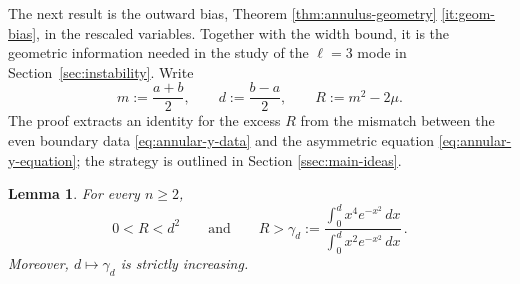 \documentclass[11pt]{article}
\numberwithin{equation}{section}
\newtheorem{lemma}[theorem]{Lemma}
\theoremstyle{definition}
\begin{document}
The next result is the outward bias, Theorem \ref{thm:annulus-geometry} \ref{it:geom-bias}, in the rescaled variables. Together with the width bound, it is the geometric information needed in the study of the $\ell=3$ mode in Section~\ref{sec:instability}. Write
\begin{equation}\label{def:asymmetry}
    m:=\frac{a+b}2,
    \qquad
    d:=\frac{b-a}2,
    \qquad
    R:=m^2-2\mu.
\end{equation}
The proof extracts an identity for the excess $R$ from the mismatch between the even boundary data \eqref{eq:annular-y-data} and the asymmetric equation \eqref{eq:annular-y-equation}; the strategy is outlined in Section \ref{ssec:main-ideas}.

\begin{lemma}\label{lem:annular-midpoint}
For every $n\geq2$,
\[
    0<R<d^2
    \qquad\text{and}\qquad
    R>\gamma_d:=\frac{\int_0^d x^4e^{-x^2}\,dx}{\int_0^d x^2e^{-x^2}\,dx}\,.
\]
Moreover, $d\mapsto\gamma_d$ is strictly increasing.
\end{lemma}
\end{document}

